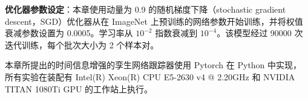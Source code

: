 \textbf{优化器参数设定}：本章使用动量为 0.9 的随机梯度下降（stochastic gradient descent，SGD）优化器从在 ImageNet 上预训练的网络参数开始训练，并将权值衰减参数设置为 0.0005。学习率从 $10^{-2}$ 指数衰减到 $10^{-4}$。该模型经过 90000 次迭代训练，每个批次大小为 2 个样本对。

本章所提出的时间信息增强的孪生网络跟踪器使用 Pytorch 在 Python 中实现，所有实验在装配有 Intel(R) Xeon(R) CPU E5-2630 v4 @ 2.20GHz 和 NVIDIA TITAN 1080Ti GPU 的工作站上执行。



